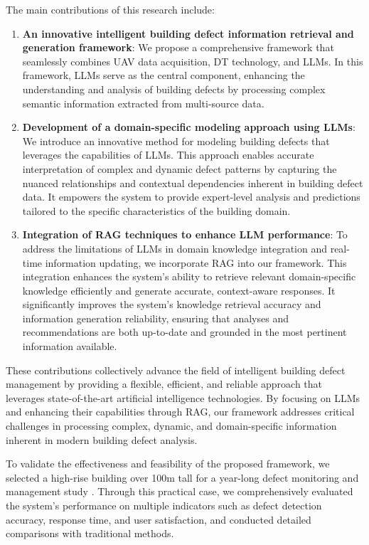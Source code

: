 \documentclass[a4paper,fleqn]{cas-sc}
\begin{document}
The main contributions of this research include:

\begin{enumerate}
\item \textbf{An innovative intelligent building defect information retrieval and generation framework}: We propose a comprehensive framework that seamlessly combines UAV data acquisition, DT technology, and LLMs. In this framework, LLMs serve as the central component, enhancing the understanding and analysis of building defects by processing complex semantic information extracted from multi-source data.

\item \textbf{Development of a domain-specific modeling approach using LLMs}: We introduce an innovative method for modeling building defects that leverages the capabilities of LLMs. This approach enables accurate interpretation of complex and dynamic defect patterns by capturing the nuanced relationships and contextual dependencies inherent in building defect data. It empowers the system to provide expert-level analysis and predictions tailored to the specific characteristics of the building domain.

\item \textbf{Integration of RAG techniques to enhance LLM performance}: To address the limitations of LLMs in domain knowledge integration and real-time information updating, we incorporate RAG into our framework. This integration enhances the system's ability to retrieve relevant domain-specific knowledge efficiently and generate accurate, context-aware responses. It significantly improves the system's knowledge retrieval accuracy and information generation reliability, ensuring that analyses and recommendations are both up-to-date and grounded in the most pertinent information available.
\end{enumerate}

These contributions collectively advance the field of intelligent building defect management by providing a flexible, efficient, and reliable approach that leverages state-of-the-art artificial intelligence technologies. By focusing on LLMs and enhancing their capabilities through RAG, our framework addresses critical challenges in processing complex, dynamic, and domain-specific information inherent in modern building defect analysis.

To validate the effectiveness and feasibility of the proposed framework, we selected a high-rise building over 100m tall for a year-long defect monitoring and management study \cite{zhang2023automated}. Through this practical case, we comprehensively evaluated the system's performance on multiple indicators such as defect detection accuracy, response time, and user satisfaction, and conducted detailed comparisons with traditional methods.
\end{document}
